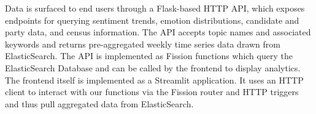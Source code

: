 Data is surfaced to end users through a Flask-based HTTP API, which exposes endpoints for querying sentiment trends, emotion distributions, candidate and party data, and census information. The API accepts topic names and associated keywords and returns pre-aggregated weekly time series data drawn from ElasticSearch. The API is implemented as Fission functions which query the ElasticSearch Database and can be called by the frontend to display analytics. The frontend itself is implemented as a Streamlit application. It uses an HTTP client to interact with our functions via the Fission router and HTTP triggers and thus pull aggregated data from ElasticSearch.

